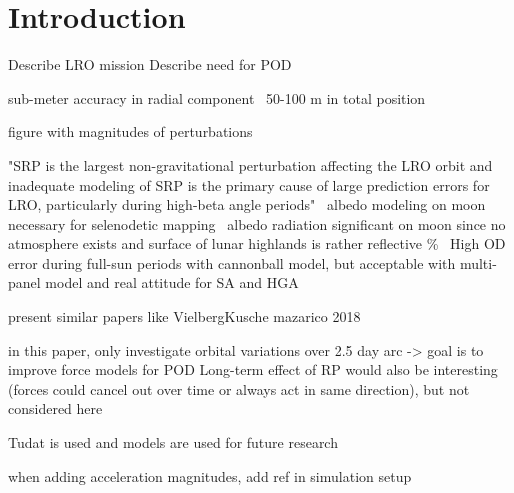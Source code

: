 \section{Introduction}
\label{sec:introduction}

Describe LRO mission
Describe need for POD

sub-meter accuracy in radial component~\cite{Zuber2009}
50-100 m in total position~\cite{Chin2007}

figure with magnitudes of perturbations

"SRP is the largest non-gravitational perturbation affecting the LRO orbit and inadequate modeling of SRP is the primary cause of large prediction errors for LRO, particularly during high-beta angle periods"~\cite{Slojkowski2015}
albedo modeling on moon necessary for selenodetic mapping~\cite{Floberghagen1999}
albedo radiation significant on moon since no atmosphere exists and surface of lunar highlands is rather reflective \%~\cite{Floberghagen1999}
High OD error during full-sun periods with cannonball model, but acceptable with multi-panel model and real attitude for SA and HGA~\cite[]{Slojkowski2014}

present similar papers like VielbergKusche
mazarico 2018

in this paper, only investigate orbital variations over 2.5 day arc -> goal is to improve force models for POD
Long-term effect of RP would also be interesting (forces could cancel out over time or always act in same direction), but not considered here

\gls{Tudat} is used and models are used for future research


when adding acceleration magnitudes, add ref in simulation setup